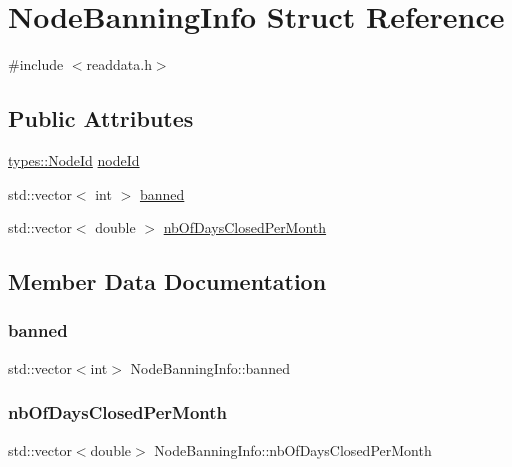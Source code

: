 \hypertarget{struct_node_banning_info}{}\section{Node\+Banning\+Info Struct Reference}
\label{struct_node_banning_info}


{\ttfamily \#include $<$readdata.\+h$>$}

\subsection*{Public Attributes}
\begin{DoxyCompactItemize}
\item 
\mbox{\hyperlink{classtypes_1_1_node_id}{types\+::\+Node\+Id}} \mbox{\hyperlink{struct_node_banning_info_a36fe6e08eec0da529dcd5ac9a863f831}{node\+Id}}
\item 
std\+::vector$<$ int $>$ \mbox{\hyperlink{struct_node_banning_info_a88a68c49d49ad28f0a5ba35dd0239194}{banned}}
\item 
std\+::vector$<$ double $>$ \mbox{\hyperlink{struct_node_banning_info_a2233d447592e8e6665c5e43c34a13ba9}{nb\+Of\+Days\+Closed\+Per\+Month}}
\end{DoxyCompactItemize}


\subsection{Member Data Documentation}
\mbox{\label{struct_node_banning_info_a88a68c49d49ad28f0a5ba35dd0239194}} 
\subsubsection{\texorpdfstring{banned}{banned}}
{\footnotesize\ttfamily std\+::vector$<$int$>$ Node\+Banning\+Info\+::banned}

\mbox{\label{struct_node_banning_info_a2233d447592e8e6665c5e43c34a13ba9}} 
\subsubsection{\texorpdfstring{nbOfDaysClosedPerMonth}{nbOfDaysClosedPerMonth}}
{\footnotesize\ttfamily std\+::vector$<$double$>$ Node\+Banning\+Info\+::nb\+Of\+Days\+Closed\+Per\+Month}

